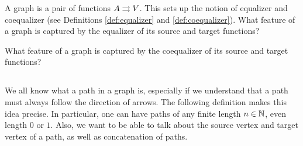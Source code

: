 \documentclass[CT4S-EN-RU]{subfiles}
\begin{document}
\begin{exerciseRUS}\label{exc:lattice}
\end{exerciseRUS}

\begin{exerciseENG}\label{exc:(co)equalizer of graph}
A graph is a pair of functions $A\rightrightarrows V$. This sets up the notion of equalizer and coequalizer (see Definitions \ref{def:equalizer} and \ref{def:coequalizer}). 
\sexc What feature of a graph is captured by the equalizer of its source and target functions? 
\item What feature of a graph is captured by the coequalizer of its source and target functions?
\endsexc
\end{exerciseENG}

\begin{exerciseRUS}\label{exc:(co)equalizer of graph}
\end{exerciseRUS}


\subsection{}\label{sec:paths in graph}

\begin{blockENG}
We all know what a path in a graph is, especially if we understand that a path must always follow the direction of arrows. The following definition makes this idea precise. In particular, one can have paths of any finite length $n\in{\mathbb N}$, even length $0$ or $1$. Also, we want to be able to talk about the source vertex and target vertex of a path, as well as concatenation of paths.
\end{blockENG}
\end{document}
